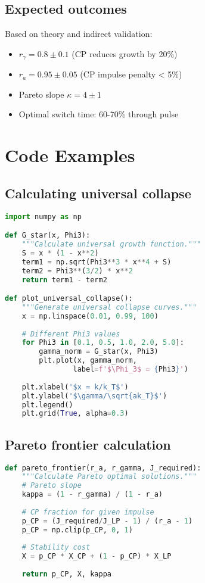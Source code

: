 \documentclass[aps,pre,twocolumn,superscriptaddress]{revtex4-2}
\begin{document}
\subsection{Expected outcomes}

Based on theory and indirect validation:
\begin{itemize}
\item $r_\gamma = 0.8 \pm 0.1$ (CP reduces growth by 20\%)
\item $r_a = 0.95 \pm 0.05$ (CP impulse penalty < 5\%)
\item Pareto slope $\kappa = 4 \pm 1$
\item Optimal switch time: 60-70\% through pulse
\end{itemize}

\section{Code Examples}

\subsection{Calculating universal collapse}

\begin{lstlisting}[language=Python, caption=Universal collapse calculation]
import numpy as np

def G_star(x, Phi3):
    """Calculate universal growth function."""
    S = x * (1 - x**2)
    term1 = np.sqrt(Phi3**3 * x**4 + S)
    term2 = Phi3**(3/2) * x**2
    return term1 - term2

def plot_universal_collapse():
    """Generate universal collapse curves."""
    x = np.linspace(0.01, 0.99, 100)
    
    # Different Phi3 values
    for Phi3 in [0.1, 0.5, 1.0, 2.0, 5.0]:
        gamma_norm = G_star(x, Phi3)
        plt.plot(x, gamma_norm, 
                label=f'$\Phi_3$ = {Phi3}')
    
    plt.xlabel('$x = k/k_T$')
    plt.ylabel('$\gamma/\sqrt{ak_T}$')
    plt.legend()
    plt.grid(True, alpha=0.3)
\end{lstlisting}

\subsection{Pareto frontier calculation}

\begin{lstlisting}[language=Python, caption=Pareto frontier generation]
def pareto_frontier(r_a, r_gamma, J_required):
    """Calculate Pareto optimal solutions."""
    # Pareto slope
    kappa = (1 - r_gamma) / (1 - r_a)
    
    # CP fraction for given impulse
    p_CP = (J_required/J_LP - 1) / (r_a - 1)
    p_CP = np.clip(p_CP, 0, 1)
    
    # Stability cost
    X = p_CP * X_CP + (1 - p_CP) * X_LP
    
    return p_CP, X, kappa
\end{lstlisting}
\end{document}
